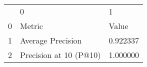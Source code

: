 \begin{tabular}{lll}
 & 0 & 1 \\
0 & Metric & Value \\
1 & Average Precision & 0.922337 \\
2 & Precision at 10 (P@10) & 1.000000 \\
\end{tabular}

